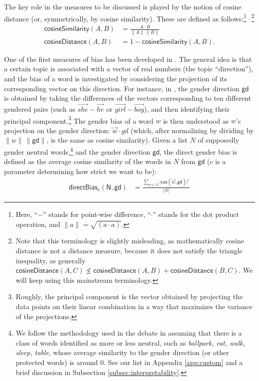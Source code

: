 \documentclass{clv3}
\begin{document}
The key role in the measures to be discussed is played by the notion of
cosine distance (or, symmetrically, by cosine similarity). These are
defined as follows:\footnote{Here, ``\(-\)'' stands for point-wise
  difference, ``\(\cdot\)'' stands for the dot product operation, and
  \(\lVert a\rVert = \sqrt{(a \cdot a)}\).}
\(^{\!\!\! , \,}\)\footnote{Note that this terminology is slightly
  misleading, as mathematically cosine distance is not a distance
  measure, because it does not satisfy the triangle inequality, as
  generally
  \(\mathsf{cosineDistance}(A,C) \not \leq \mathsf{cosineDistance}(A,B)+ \mathsf{cosineDistance}(B,C)\).
  We will keep using this mainstream terminology.}
\begin{align} \tag{Sim}
\mathsf{cosineSimilarity}(A,B) & = \frac{A \cdot B}{\lVert  A \rVert \,\lVert B \rVert}
\\
\tag{Distance}
\mathsf{cosineDistance}(A,B) &  = 1 - \mathsf{cosineSimilarity}(A,B).
\end{align}

One of the first measures of bias has been developed in \citep{Bolukbasi2016man}. The
general idea is that a certain topic is associated with a vector of real
numbers (the topic ``direction''), and the bias of a word is
investigated by considering the projection of its corresponding vector
on this direction. For instance, in \citep{Bolukbasi2016man}, the gender direction
\(\mathsf{gd}\) is obtained by taking the differences of the vectors
corresponding to ten different gendered pairs (such as
\(\overrightarrow{she} - \overrightarrow{he}\) or
\(\overrightarrow{girl} - \overrightarrow{boy}\)), and then identifying
their principal component.\footnote{Roughly, the principal component is
  the vector obtained by projecting the data points on their linear
  combination in a way that maximizes the variance of the projections.}
The gender bias of a word \(w\) is then understood as \(w\)'s projection
on the gender direction: \(\vec{w} \cdot gd\) (which, after normalizing
by dividing by \(\lVert w \rVert \,\lVert \mathsf{gd} \rVert\), is the
same as cosine similarity). Given a list \(N\) of supposedly gender
neutral words,\footnote{We follow the methodology used in the debate in
  assuming that there is a class of words identified as more or less
  neutral, such as \emph{ballpark, eat, walk, sleep, table}, whose
  average similarity to the gender direction (or other protected words)
  is around 0. See our list in Appendix \ref{app:custom} and a brief
  discussion in Subsection \ref{subsec:interpretability}.} and the
gender direction \(\mathsf{gd}\), the direct gender bias is defined as
the average cosine similarity of the words in \(N\) from \(\mathsf{gd}\)
(\(c\) is a parameter determining how strict we want to be):
\begin{align*}
\mathsf{directBias_c(N,gd)} & = \frac{\sum_{w\in N}\vert \mathsf{cos}(\vec{w},\mathsf{gd})\vert^c}{\vert N \vert }
\end{align*} \normalsize 
\end{document}
